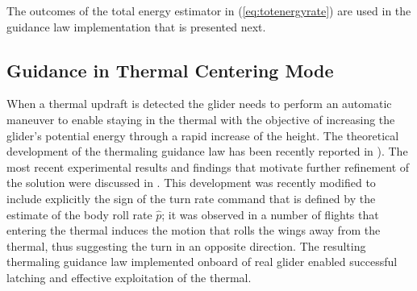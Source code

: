 \documentclass{ifacconf}
\begin{document}
The outcomes of the total energy estimator in (\ref{eq:totenergyrate}) are used in the guidance law implementation that is presented next.

\subsection{Guidance in Thermal Centering Mode}
\label{subsec:ThermGuidance}

When a thermal updraft is detected the glider needs to perform an automatic maneuver to enable staying in the thermal with the objective of increasing the glider's potential energy through a rapid increase of the height. The theoretical development of the thermaling guidance law has been recently reported in \cite{AKlass_JGCD:2012}). The most recent experimental results and findings that motivate further refinement of the solution were discussed in \cite{AKlass_CDC:2012}. This development was recently modified to include explicitly the sign of the turn rate command that is defined by the estimate of the body roll rate $\hat{p}$; it was observed in a number of flights that entering the thermal induces the motion that rolls the wings away from the thermal, thus suggesting the turn in an opposite direction. The resulting thermaling guidance law implemented onboard of real glider enabled successful latching and effective exploitation of the thermal.
\end{document}
